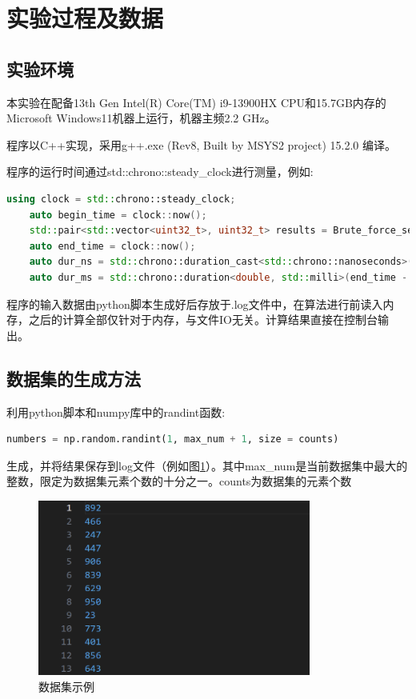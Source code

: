 \documentclass[UTF8,12pt,a4paper]{ctexart}
\begin{document}
\section{实验过程及数据}
\subsection{实验环境}
本实验在配备13th Gen Intel(R) Core(TM) i9-13900HX CPU和15.7GB内存的Microsoft Windows11机器上运行，机器主频2.2 GHz。

程序以C++实现，采用g++.exe (Rev8, Built by MSYS2 project) 15.2.0 编译。

程序的运行时间通过std::chrono::steady\_clock进行测量，例如:
\begin{lstlisting}[language={C++}, basicstyle=\ttfamily\footnotesize]
    using clock = std::chrono::steady_clock;
    auto begin_time = clock::now();
    std::pair<std::vector<uint32_t>, uint32_t> results = Brute_force_search_pro(numbers);
    auto end_time = clock::now();
    auto dur_ns = std::chrono::duration_cast<std::chrono::nanoseconds>(end_time - begin_time).count();
    auto dur_ms = std::chrono::duration<double, std::milli>(end_time - begin_time).count();
\end{lstlisting} 

程序的输入数据由python脚本生成好后存放于.log文件中，在算法进行前读入内存，之后的计算全部仅针对于内存，与文件IO无关。计算结果直接在控制台输出。
\subsection{数据集的生成方法}
利用python脚本和numpy库中的randint函数: 
\begin{lstlisting}[language=python, basicstyle=\footnotesize]
    numbers = np.random.randint(1, max_num + 1, size = counts)
\end{lstlisting}
生成，并将结果保存到log文件（例如图\ref{fig:data}）。其中max\_num是当前数据集中最大的整数，限定为数据集元素个数的十分之一。counts为数据集的元素个数

\begin{figure}[htbp]
    \centering
    \includegraphics[width=0.8\textwidth]{figures/data.png}
    \caption{数据集示例}
    \label{fig:data} 
\end{figure}
\end{document}
